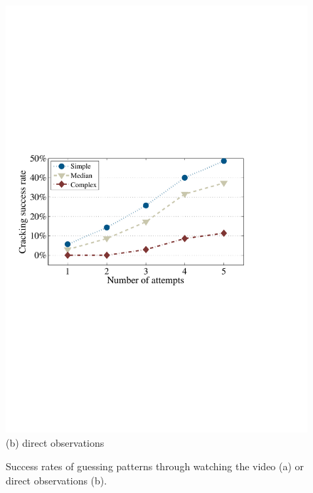 \begin{figure}[!t]
{\begin{minipage}[t]{0.35\textwidth}
                \includegraphics[width=\textwidth]{fig/look-finger.pdf}\\
                \centering \footnotesize (b) direct observations
                \end{minipage}
            }
            \vspace{-2mm}
            \caption{Success rates of guessing patterns through watching the video (a) or direct observations (b).}
            \label{fig:look-unlocking process}
        \end{figure}

